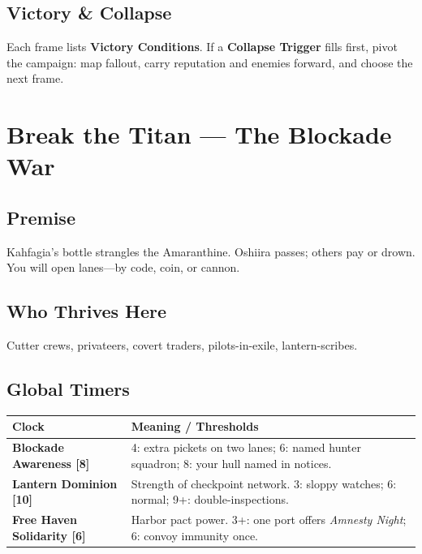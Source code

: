 \documentclass[11pt,oneside]{book}
\begin{document}
\begin{itemize}
\subsection*{Victory \& Collapse}
Each frame lists \textbf{Victory Conditions}. If a \textbf{Collapse Trigger} fills first, pivot the campaign: map fallout, carry reputation and enemies forward, and choose the next frame.

\section{\textbf{Break the Titan} --- The Blockade War}

\subsection*{Premise}
Kahfagia's bottle strangles the Amaranthine. Oshiira passes; others pay or drown. You will open lanes---by code, coin, or cannon.

\subsection*{Who Thrives Here}
Cutter crews, privateers, covert traders, pilots-in-exile, lantern-scribes.

\subsection*{Global Timers}
\begin{tabularx}{\linewidth}{@{}p{3.4cm} X@{}}
\toprule
\textbf{Clock} & \textbf{Meaning / Thresholds}\\
\midrule
\textbf{Blockade Awareness [8]} & 4: extra pickets on two lanes; 6: named hunter squadron; 8: your hull named in notices.\\
\textbf{Lantern Dominion [10]} & Strength of checkpoint network. 3: sloppy watches; 6: normal; 9+: double-inspections.\\
\textbf{Free Haven Solidarity [6]} & Harbor pact power. 3+: one port offers \emph{Amnesty Night}; 6: convoy immunity once.\\
\bottomrule
\end{tabularx}


\end{itemize}
\end{document}

